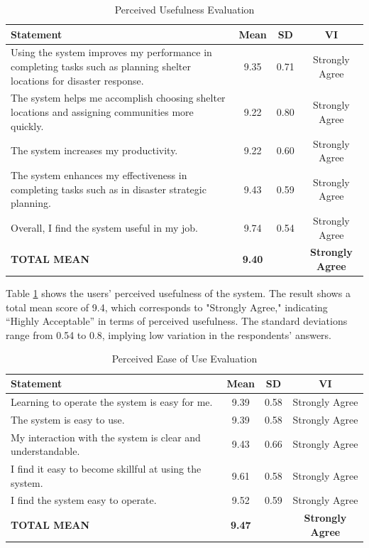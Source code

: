 	\begin{table}[h!]
		\centering
		\caption{Perceived Usefulness Evaluation}
		\label{percuse}
		\renewcommand{\arraystretch}{1.2}
		\begin{tabularx}{\linewidth}{|X|c|c|c|}
			\hline
			\textbf{Statement} & \textbf{Mean} & \textbf{SD} & \textbf{VI} \\ \hline
			Using the system improves my performance in completing tasks such as planning shelter locations for disaster response.
			& 9.35 & 0.71 & Strongly Agree \\ \hline
			The system helps me accomplish choosing shelter locations and assigning communities more quickly.
			& 9.22& 0.80 & Strongly Agree  \\ \hline
			The system increases my productivity.
			& 9.22 & 0.60 & Strongly Agree  \\ \hline
			The system enhances my effectiveness in completing tasks such as in disaster strategic planning.
			& 9.43 & 0.59 & Strongly Agree  \\ \hline
			Overall, I find the system useful in my job.
			& 9.74 & 0.54 & Strongly Agree  \\ \hline
			\textbf{TOTAL MEAN} & \textbf{9.40} & & \textbf{Strongly Agree}  \\ \hline
		\end{tabularx}
	\end{table}
	
	Table \ref{percuse} shows the users’ perceived usefulness of the system. The result shows a total mean score of 9.4, which corresponds to "Strongly Agree," indicating “Highly Acceptable” in terms of perceived usefulness. The standard deviations range from 0.54 to 0.8, implying low variation in the respondents’ answers.
	
	\begin{table}[h!]
		\centering
		\caption{Perceived Ease of Use Evaluation}
		\label{percease}
		\renewcommand{\arraystretch}{1.2}
		\begin{tabularx}{\linewidth}{|X|c|c|c|}
			\hline
			\textbf{Statement} & \textbf{Mean} & \textbf{SD} & \textbf{VI} \\ \hline
			Learning to operate the system is easy for me.
			& 9.39 & 0.58 & Strongly Agree \\ \hline
			The system is easy to use.
			& 9.39 & 0.58 & Strongly Agree \\ \hline
			My interaction with the system is clear and understandable.
			& 9.43 & 0.66 & Strongly Agree \\ \hline
			I find it easy to become skillful at using the system.
			& 9.61 & 0.58 & Strongly Agree \\ \hline
			I find the system easy to operate.
			& 9.52 & 0.59 & Strongly Agree \\ \hline
			\textbf{TOTAL MEAN} & \textbf{9.47} & & \textbf{Strongly Agree} \\ \hline
		\end{tabularx}
	\end{table}
	
